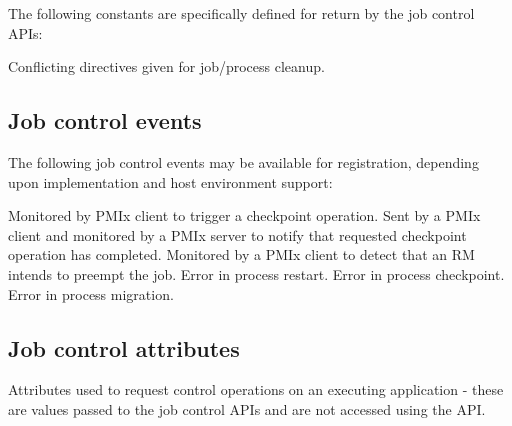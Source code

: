 The following constants are specifically defined for return by the job control \acp{API}:

\begin{constantdesc}

%
Conflicting directives given for job/process cleanup.

\end{constantdesc}

\subsection{Job control events}
\label{api:struct:events:jobcontrol}

The following job control events may be available for registration, depending upon implementation and host environment support:

\begin{constantdesc}
%
Monitored by \ac{PMIx} client to trigger a checkpoint operation.
%
Sent by a \ac{PMIx} client and monitored by a \ac{PMIx} server to notify that requested checkpoint operation has completed.
%
Monitored by a \ac{PMIx} client to detect that an \ac{RM} intends to preempt the job.
%
Error in process restart.
%
Error in process checkpoint.
%
Error in process migration.
%
\end{constantdesc}

\subsection{Job control attributes}
\label{api:struct:attributes:jobcontrol}

Attributes used to request control operations on an executing application - these are values passed to the job control \acp{API} and are not accessed using the  \ac{API}.

